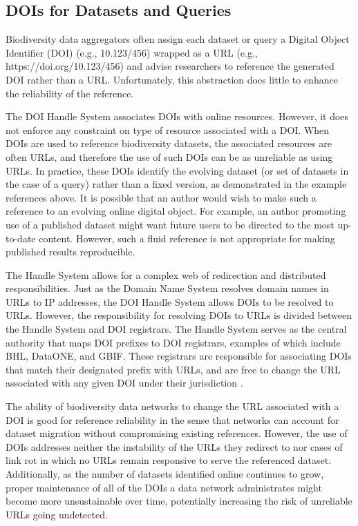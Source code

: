 \subsection*{DOIs for Datasets and Queries}
Biodiversity data aggregators often assign each dataset or query a Digital Object Identifier (DOI) \citep{Paskin_2009} (e.g., 10.123/456) wrapped as a URL (e.g., https://doi.org/10.123/456) and advise researchers to reference the generated DOI rather than a URL. Unfortunately, this abstraction does little to enhance the reliability of the reference.

The DOI Handle System \citep{Paskin_2009} associates DOIs with online resources. However, it does not enforce any constraint on type of resource associated with a DOI. When DOIs are used to reference biodiversity datasets, the associated resources are often URLs, and therefore the use of such DOIs can be as unreliable as using URLs. In practice, these DOIs identify the evolving dataset (or set of datasets in the case of a query) rather than a fixed version, as demonstrated in the example references above. It is possible that an author would wish to make such a reference to an evolving online digital object. For example, an author promoting use of a published dataset might want future users to be directed to the most up-to-date content. However, such a fluid reference is not appropriate for making published results reproducible.

The Handle System allows for a complex web of redirection and distributed responsibilities. Just as the Domain Name System resolves domain names in URLs to IP addresses, the DOI Handle System allows DOIs to be resolved to URLs. However, the responsibility for resolving DOIs to URLs is divided between the Handle System and DOI registrars. The Handle System serves as the central authority that maps DOI prefixes to DOI registrars, examples of which include BHL, DataONE, and GBIF. These registrars are responsible for associating DOIs that match their designated prefix with URLs, and are free to change the URL associated with any given DOI under their jurisdiction \citep{Paskin_2009,DOI_2018}.

The ability of biodiversity data networks to change the URL associated with a DOI is good for reference reliability in the sense that networks can account for dataset migration without compromising existing references. However, the use of DOIs addresses neither the instability of the URLs they redirect to nor cases of link rot in which no URLs remain responsive to serve the referenced dataset. Additionally, as the number of datasets identified online continues to grow, proper maintenance of all of the DOIs a data network administrates might become more unsustainable over time, potentially increasing the risk of unreliable URLs going undetected.

